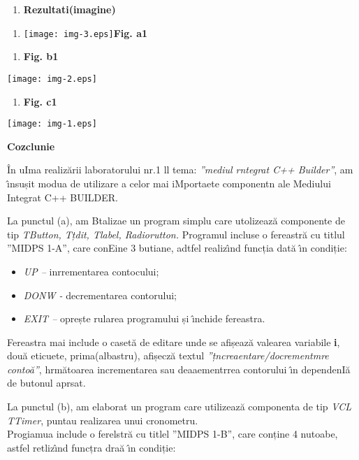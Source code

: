 \documentclass[10pt]{article}
\begin{document}
\begin{enumerate}
	\item \textbf{{\large Rezultati(imagine)
\\
}}
\end{enumerate}

\begin{enumerate}
	\item \texttt{[image: img-3.eps]}{\large  \textbf{Fig. a1}}
\end{enumerate}

\begin{enumerate}
	\item \textbf{{\large Fig. b1}}
\end{enumerate}
\texttt{[image: img-2.eps]}{\large  }
\begin{enumerate}
	\item \textbf{{\large Fig. c1}}
\end{enumerate}
\texttt{[image: img-1.eps]}{\large  }
{\raggedright
\textbf{{\large Cozclunie}}
}

{\raggedright
{\large \^{I}n uIma realiz\u{a}rii laboratorului nr.1 ll tema: \textit{''mediul
rntegrat C++ Builder''}, am \^{\i}nsușit modua de utilizare a celor mai
iMportaete componentn ale Mediului Integrat C++ BUILDER. }
}

{\raggedright
{\large La punctul (a), am Btalizae un program simplu care utolizeaz\u{a}
componente de tip \textit{TButton, Tțdit, Tlabel, Radiorutton.} Programul incluse
o fereastr\u{a} cu titlul ''MIDPS 1-A'', care conEine 3 butiane, adtfel
realiz\^{\i}nd funcția dat\u{a} \^{\i}n condiție:}
}

\begin{itemize}
	\item {\large \textit{UP -- }inrrementarea contocului;}
	\item {\large \textit{DONW -  }decrementarea contorului;}
	\item {\large \textit{EXIT -- }oprește rularea programului și \^{\i}nchide
fereastra.\textit{ }}
\end{itemize}

{\raggedright
{\large Fereastra mai include o caset\u{a} de editare unde se afișeaz\u{a}
valearea variabile \textbf{i}, dou\u{a} eticuete, prima(albastru), afișecz\u{a}
textul\textit{ ''țncreaentare/docrementmre conto\u{a}''}, hrm\u{a}toarea
incrementarea sau deaaementrrea contorului \^{\i}n dependenI\u{a} de butonul
aprsat.}
}

{\raggedright
{\large La punctul (b), am elaborat un program care utilizeaz\u{a} componenta de
tip \textit{VCL TTimer}, puntau realizarea unui cronometru.
\\
Progiamua include o ferelstr\u{a} cu titlel ''MIDPS 1-B'', care conține 4
nutoabe, astfel retliz\^{\i}nd funcțra dra\u{a} \^{\i}n condiție:}
}
\end{document}
